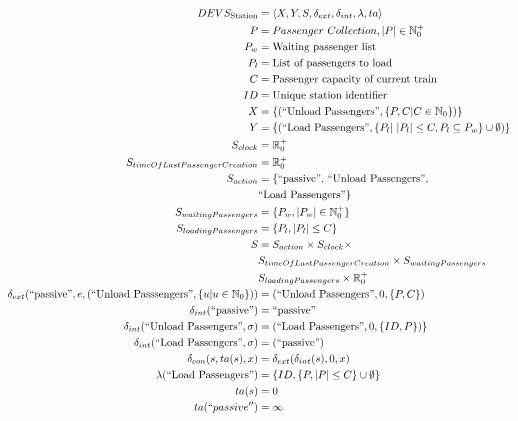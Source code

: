 \begin{align*}
DEVS_{\textrm{Station}} &= \left<X,Y,S,\delta_{ext},\delta_{int},\lambda,ta\right> \\
P &= Passenger\ Collection, |P|\in\mathbb{N}_0^+ \\
P_w &= \text{Waiting passenger list} \\
P_l &= \text{List of passengers to load} \\
C &= \text{Passenger capacity of current train} \\
ID &= \text{Unique station identifier} \\
X &= \lbrace(\text{``Unload Passengers''},\lbrace P, C|C\in\mathbb{N}_0\rbrace)\rbrace \\
Y &= \lbrace(\text{``Load Passengers''},\lbrace P_l|\ |P_l|\leq C, P_l\subseteq P_w\rbrace\cup\emptyset)\rbrace \\
S_{clock} &= \mathbb{R}_0^+ \\ 
S_{timeOfLastPassengerCreation} &= \mathbb{R}_0^+ \\
S_{action} &= \lbrace\text{``passive'', ``Unload Passengers'',} \\
	& \text{``Load Passengers''}\rbrace \\
S_{waitingPassengers} &= \lbrace P_w, |P_w|\in\mathbb{N}_0^+\rbrace \\
S_{loadingPassengers} &= \lbrace P_l, |P_l|\leq C\rbrace \\ 
S &= S_{action}\times S_{clock}\times \\
 & S_{timeOfLastPassengerCreation}\times S_{waitingPassengers} \\
 & S_{loadingPassengers}\times \mathbb{R}_0^+ \\
\delta_{ext}(\text{``passive''},e,(\text{``Unload Passsengers''},\lbrace u|u\in\mathbb{N}_0\rbrace)) &= (\text{``Unload Passengers''},0,\lbrace P, C\rbrace) \\
\delta_{int}(\text{``passive''}) &= \text{``passive''} \\
\delta_{int}(\text{``Unload Passengers''},\sigma) &= (\text{``Load Passengers''},0,\lbrace ID, P\rbrace)\rbrace\ \\
\delta_{int}(\text{``Load Passengers''},\sigma) &= (\text{``passive''}) \\
\delta_{con}(s,ta(s),x) &= \delta_{ext}(\delta_{int}(s),0,x) \\
\lambda(\text{``Load Passengers''}) &= \lbrace ID,\lbrace P, |P|\leq C\rbrace\cup\emptyset\rbrace \\
ta(s) &= 0 \\
ta(``passive'') &= \infty \\
\end{align*}
%
